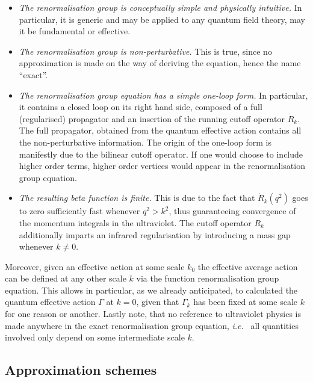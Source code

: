\documentclass[11pt]{book}
\newcommand\ie{\textit{i.e.}\ }
\numberwithin{equation}{chapter}
\begin{document}
\begin{itemize}
  \setlength\itemsep{1.2mm}
  \item
    \textit{The renormalisation group is conceptually simple and physically intuitive.}
    In particular, it is generic and may be applied to any quantum field theory,
    may it be fundamental or effective.
  \item
    \textit{The renormalisation group is non-perturbative.}
    This is true, since no approximation is made on the way of deriving the
    equation, hence the name ``exact''.
  \item
    \textit{The renormalisation group equation has a simple one-loop form.}
    In particular, it contains a closed loop on its right hand side,
    composed of a full (regularised)  propagator and an insertion
    of the running cutoff operator $\dot R_k$.
    The full propagator, obtained from the quantum effective action contains
    all the non-perturbative information.
    The origin of the one-loop form is manifestly due to the bilinear
    cutoff operator. If one would choose to include higher order terms,
    higher order vertices would appear in the renormalisation group equation.
  \item
    \textit{The resulting beta function is finite.}
    This is due to the fact that $\dot R_k(q^2)$ goes to zero
    sufficiently fast whenever $q^2 > k^2$, thus guaranteeing convergence
    of the momentum integrals in the ultraviolet. The cutoff operator
    $R_k$ additionally imparts an infrared regularisation
    by introducing a mass gap whenever $k \neq 0$.
\end{itemize}
\bigskip
Moreover, given an effective action at some scale $k_0$ the
effective average action can be defined at any other scale $k$
via the function renormalisation group equation. This allows
in particular, as we already anticipated, to calculated the
quantum effective action $\Gamma$ at $k=0$, given that
$\Gamma_k$ has been fixed at some scale $k$ for one reason or another.
Lastly note, that no reference to ultraviolet physics is made
anywhere in the exact renormalisation group equation, \ie
all quantities involved only depend on some intermediate scale $k$.


\subsection{Approximation schemes}
\label{sec:approxschemes}
\end{document}
